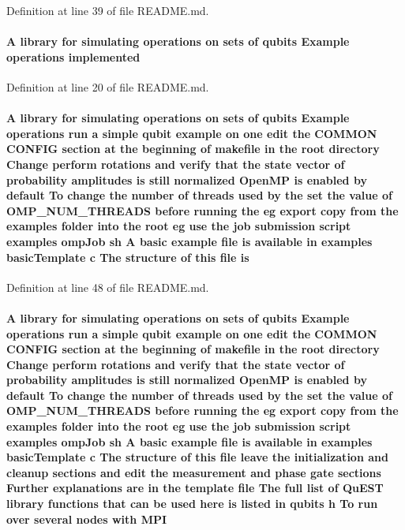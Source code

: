 Definition at line 39 of file README.md.\hypertarget{README_8md_a5b6d5263988c72168a803d19675d481d}{
\paragraph[{implemented}]{\setlength{\rightskip}{0pt plus 5cm}A library for simulating operations on sets of qubits Example operations {\bf implemented}}\hfill}
\label{README_8md_a5b6d5263988c72168a803d19675d481d}


Definition at line 20 of file README.md.\hypertarget{README_8md_a2a622829425af2df994a6f7c6deb0c91}{
\paragraph[{is}]{\setlength{\rightskip}{0pt plus 5cm}A library for simulating operations on sets of qubits Example operations run a simple qubit example on one edit the COMMON CONFIG section at the beginning of makefile in the root directory Change perform {\bf rotations} and verify that the state vector of probability amplitudes {\bf is} still normalized OpenMP {\bf is} enabled by default To change the number of threads used by the set the value of {\bf OMP\_\-NUM\_\-THREADS} before running the {\bf eg} export copy from the examples {\bf folder} into the root {\bf eg} use the job submission script examples ompJob sh A basic example file {\bf is} available in examples basicTemplate c The structure of this file {\bf is}}\hfill}
\label{README_8md_a2a622829425af2df994a6f7c6deb0c91}


Definition at line 48 of file README.md.\hypertarget{README_8md_a2ef63d6f3e80a1213c1768b39ff03fca}{
\paragraph[{MPI}]{\setlength{\rightskip}{0pt plus 5cm}A library for simulating operations on sets of qubits Example operations run a simple qubit example on one edit the COMMON CONFIG section at the beginning of makefile in the root directory Change perform {\bf rotations} and verify that the state vector of probability amplitudes {\bf is} still normalized OpenMP {\bf is} enabled by default To change the number of threads used by the set the value of {\bf OMP\_\-NUM\_\-THREADS} before running the {\bf eg} export copy from the examples {\bf folder} into the root {\bf eg} use the job submission script examples ompJob sh A basic example file {\bf is} available in examples basicTemplate c The structure of this file leave the initialization and cleanup sections and edit the measurement and phase gate sections Further explanations are in the template file The full list of QuEST library functions that can be used here {\bf is} listed in qubits h To run over several nodes with {\bf MPI}}\hfill}
\label{README_8md_a2ef63d6f3e80a1213c1768b39ff03fca}


